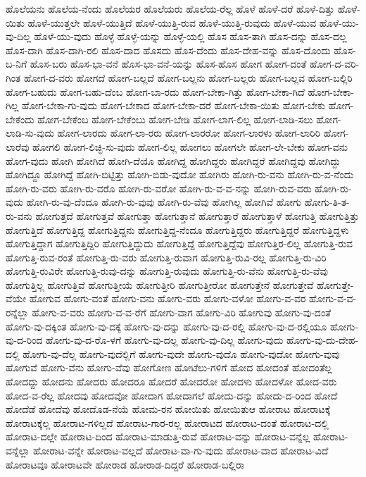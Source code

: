 {ಹೊಲೆಯನು
ಹೊಲೆಯ-ನೆಂದು
ಹೊಲೆಯರ
ಹೊಲೆಯರು
ಹೊಲೆಯ-ರೆಲ್ಲ
ಹೊಳೆ
ಹೊಳೆ-ದರೆ
ಹೊಳೆ-ದಿತ್ತು
ಹೊಳೆ-ಯಿತು
ಹೊಳೆ-ಯುತ್ತಲೇ
ಹೊಳೆ-ಯುತ್ತಿದೆ
ಹೊಳೆ-ಯುತ್ತಿ-ರುವ
ಹೊಳೆ-ಯುತ್ತಿ-ರುವುದು
ಹೊಳೆ-ಯುವ
ಹೊಳೆ-ಯು-ವು-ದಿಲ್ಲ
ಹೊಳೆ-ಯು-ವುದು
ಹೊಳ್ಳೆ
ಹೊಳ್ಳೆ-ಯನ್ನು
ಹೊಳ್ಳೆ-ಯಲ್ಲಿ
ಹೊಸ
ಹೊಸ-ತಾಗಿ
ಹೊಸ-ದನ್ನು
ಹೊಸ-ದಲ್ಲ
ಹೊಸ-ದಾಗಿ
ಹೊಸ-ದಾಗಿ-ರಲಿ
ಹೊಸ-ದಾದ
ಹೊಸದು
ಹೊಸ-ದೆಂದು
ಹೊಸ-ದೇಹ-ವನ್ನು
ಹೊಸ-ದೊಂದು
ಹೊಸ-ಬ-ನಿಗೆ
ಹೊಸ-ಬರು
ಹೊಸ-ಭಾ-ವನೆ
ಹೊಸ-ಭಾ-ವನೆ-ಯನ್ನು
ಹೊಸ-ಹೊಸ
ಹೋಗ
ಹೋಗ-ದಂತೆ
ಹೋಗ-ದ-ವರಿ-ಗಿಂತ
ಹೋಗ-ದ-ವರು
ಹೋಗದೆ
ಹೋಗ-ಬಲ್ಲದೆ
ಹೋಗ-ಬಲ್ಲನು
ಹೋಗ-ಬಲ್ಲರು
ಹೋಗ-ಬಲ್ಲವ
ಹೋಗ-ಬಲ್ಲಿರಿ
ಹೋಗ-ಬಹುದು
ಹೋಗ-ಬಹು-ದೆಂಬ
ಹೋಗ-ಬಾ-ರದು
ಹೋಗ-ಬೇಕಾ-ಗಿತ್ತು
ಹೋಗ-ಬೇಕಾ-ಗಿದೆ
ಹೋಗ-ಬೇಕಾ-ಗಿಲ್ಲ
ಹೋಗ-ಬೇಕಾ-ಗು-ವುದು
ಹೋಗ-ಬೇಕಾದ
ಹೋಗ-ಬೇಕಾ-ದರೆ
ಹೋಗ-ಬೇಕಾ-ಯಿತು
ಹೋಗ-ಬೇಕು
ಹೋಗ-ಬೇಕೆಂದು
ಹೋಗ-ಬೇಕೆಂಬ
ಹೋಗ-ಬೇಕೆಂಬು
ಹೋಗ-ಬೇಡಿ
ಹೋಗ-ಲಾಗ-ಲಿಲ್ಲ
ಹೋಗ-ಲಾಡಿ-ಸಲು
ಹೋಗ-ಲಾಡಿ-ಸು-ವುದು
ಹೋಗ-ಲಾರದು
ಹೋಗ-ಲಾ-ರರು
ಹೋಗ-ಲಾರರೋ
ಹೋಗ-ಲಾರಳು
ಹೋಗ-ಲಾರಿರಿ
ಹೋಗ-ಲಾರೆವು
ಹೋಗಲಿ
ಹೋಗ-ಲಿಚ್ಛಿ-ಸು-ವುದು
ಹೋಗ-ಲಿಲ್ಲ
ಹೋಗಲು
ಹೋಗಲೇ
ಹೋಗ-ಲೇ-ಬೇಕು
ಹೋಗ-ವನು
ಹೋಗ-ವುದು
ಹೋಗಿ
ಹೋಗಿದೆ
ಹೋಗಿ-ದೆಯೊ
ಹೋಗಿದ್ದ
ಹೋಗಿದ್ದರು
ಹೋಗಿದ್ದರೆ
ಹೋಗಿದ್ದವು
ಹೋಗಿದ್ದು
ಹೋಗಿದ್ದೂ
ಹೋಗಿದ್ದೆ
ಹೋಗಿ-ಬಿಟ್ಟಿತ್ತು
ಹೋಗಿ-ಬಿಡು-ವುದೋ
ಹೋಗಿರು
ಹೋಗಿ-ರು-ವನು
ಹೋಗಿ-ರು-ವ-ನೆಂದು
ಹೋಗಿ-ರು-ವರು
ಹೋಗಿ-ರು-ವರೊ
ಹೋಗಿ-ರು-ವರೋ
ಹೋಗಿ-ರು-ವ-ವ-ನನ್ನು
ಹೋಗಿ-ರುವ-ವರು
ಹೋಗಿ-ರು-ವುದು
ಹೋಗಿ-ರು-ವು-ದೆಂದೂ
ಹೋಗಿ-ರು-ವುವು
ಹೋಗಿ-ರು-ವೆವು
ಹೋಗಿಲ್ಲ
ಹೋಗಿವೆ
ಹೋಗು
ಹೋಗು-ತಿ-ತ-ರು-ವನು
ಹೋಗುತ್ತದೆ
ಹೋಗುತ್ತವೆ
ಹೋಗುತ್ತಾ
ಹೋಗುತ್ತಾನೆ
ಹೋಗುತ್ತಾರೆ
ಹೋಗುತ್ತಾಳೆ
ಹೋಗುತ್ತಿ
ಹೋಗುತ್ತಿತ್ತು
ಹೋಗುತ್ತಿದೆ
ಹೋಗುತ್ತಿದ್ದ
ಹೋಗುತ್ತಿದ್ದನು
ಹೋಗುತ್ತಿದ್ದ-ನೆಂದೂ
ಹೋಗುತ್ತಿದ್ದರು
ಹೋಗುತ್ತಿದ್ದರೆ
ಹೋಗುತ್ತಿದ್ದಳು
ಹೋಗುತ್ತಿದ್ದಾಗ
ಹೋಗುತ್ತಿದ್ದಿರಿ
ಹೋಗುತ್ತಿದ್ದುದು
ಹೋಗುತ್ತಿದ್ದೆ
ಹೋಗುತ್ತಿದ್ದೆವು
ಹೋಗುತ್ತಿರ-ಲಿಲ್ಲ
ಹೋಗುತ್ತಿ-ರುವ
ಹೋಗುತ್ತಿ-ರುವ-ರಂತೆ
ಹೋಗುತ್ತಿ-ರು-ವರು
ಹೋಗುತ್ತಿ-ರುವಾಗ
ಹೋಗುತ್ತಿ-ರುವಿ-ರಲ್ಲ
ಹೋಗುತ್ತಿ-ರು-ವಿರಿ
ಹೋಗುತ್ತಿ-ರುವಿರೇ
ಹೋಗುತ್ತಿ-ರುವು-ದನ್ನು
ಹೋಗುತ್ತಿ-ರುವುದು
ಹೋಗುತ್ತಿ-ರು-ವೆನು
ಹೋಗುತ್ತಿ-ರು-ವೆವು
ಹೋಗುತ್ತಿಲ್ಲ
ಹೋಗುತ್ತಿವೆ
ಹೋಗುತ್ತೀಯೆ
ಹೋಗುತ್ತೀರಿ
ಹೋಗುತ್ತೀರೋ
ಹೋಗುತ್ತೇನೆ
ಹೋಗುತ್ತೇವೆ
ಹೋಗುತ್ತೇ-ವೆಯೇ
ಹೋಗುವ
ಹೋಗು-ವಂತೆ
ಹೋಗು-ವನು
ಹೋಗು-ವರು
ಹೋಗು-ವಳೋ
ಹೋಗು-ವ-ವರ
ಹೋಗು-ವ-ವ-ರನ್ನೆಲ್ಲಾ
ಹೋಗು-ವ-ವರು
ಹೋಗು-ವ-ವ-ರೆಗೆ
ಹೋಗು-ವಾಗ
ಹೋಗು-ವಿರಿ
ಹೋಗುವು
ಹೋಗು-ವು-ದಂತೆ
ಹೋಗು-ವು-ದಕ್ಕಿಂತ
ಹೋಗು-ವು-ದಕ್ಕೆ
ಹೋಗು-ವು-ದನ್ನು
ಹೋಗು-ವು-ದ-ರಲ್ಲಿ
ಹೋಗು-ವು-ದ-ರಲ್ಲಿಯೂ
ಹೋಗು-ವು-ದ-ರಿಂದ
ಹೋಗು-ವು-ದ-ರೊ-ಳಗೆ
ಹೋಗು-ವು-ದಲ್ಲ
ಹೋಗು-ವು-ದಿಲ್ಲ
ಹೋಗು-ವುದು
ಹೋಗು-ವು-ದು-ದೇಹ-ದಲ್ಲಿ
ಹೋಗು-ವು-ದೆಲ್ಲ
ಹೋಗು-ವುದೆಲ್ಲಿಗೆ
ಹೋಗು-ವುದೇ
ಹೋಗು-ವುದೊ
ಹೋಗು-ವುದೋ
ಹೋಗು-ವುವು
ಹೋಗುವೆ
ಹೋಗು-ವೆನು
ಹೋಗು-ವೆವು
ಹೋಗೋಣ
ಹೋಟೆಲು-ಗಳಿಗೆ
ಹೋದ
ಹೋದಂತೆ
ಹೋದಂತೆಲ್ಲ
ಹೋದದ್ದು
ಹೋದನು
ಹೋದರು
ಹೋದರೂ
ಹೋದರೆ
ಹೋದರೋ
ಹೋದಳು
ಹೋದಳೋ
ಹೋದ-ವರು
ಹೋದ-ವ-ರೆಲ್ಲ
ಹೋದವು
ಹೋದವೋ
ಹೋದಾಗ
ಹೋದಾಗಲೆ
ಹೋದು-ದನ್ನು
ಹೋದು-ದ-ರಿಂದ
ಹೋದೆ
ಹೋದೆಡೆ
ಹೋದೆವು
ಹೋದೊಡ-ನೆಯೆ
ಹೋಮ-ರನ
ಹೋಯಿತು
ಹೋಯಿತುಆ
ಹೋರಾಟ
ಹೋರಾಟಕ್ಕೆ
ಹೋರಾಟಕ್ಕೆಲ್ಲ
ಹೋರಾಟ-ಗಳಿಲ್ಲದೆ
ಹೋರಾಟ-ಗಾರ-ರಲ್ಲ
ಹೋರಾಟದ
ಹೋರಾಟ-ದಂತೆ
ಹೋರಾಟ-ದಲ್ಲಿ
ಹೋರಾಟ-ದಲ್ಲೇ
ಹೋರಾಟ-ದಿಂದ
ಹೋರಾಟ-ಮಾಡುತ್ತಿ-ರುವೆ
ಹೋರಾಟ-ವನ್ನು
ಹೋರಾಟ-ವನ್ನೆಲ್ಲ
ಹೋರಾಟ-ವನ್ನೆಲ್ಲಾ
ಹೋರಾಟ-ವನ್ನೇ
ಹೋರಾಟ-ವಲ್ಲದೆ
ಹೋರಾಟ-ವಾ-ಗು-ವುದು
ಹೋರಾಟ-ವಾದ
ಹೋರಾಟ-ವಿದೆ
ಹೋರಾಟವೂ
ಹೋರಾಟವೇ
ಹೋರಾಡ
ಹೋರಾಡ-ದಿದ್ದರೆ
ಹೋರಾಡ-ಬಲ್ಲಿರಾ
}

